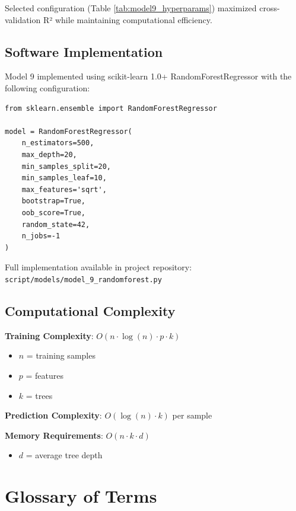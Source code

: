 Selected configuration (Table \ref{tab:model9_hyperparams}) maximized cross-validation R² while maintaining computational efficiency.

\subsection{Software Implementation}

Model 9 implemented using scikit-learn 1.0+ RandomForestRegressor with the following configuration:

\begin{verbatim}
from sklearn.ensemble import RandomForestRegressor

model = RandomForestRegressor(
    n_estimators=500,
    max_depth=20,
    min_samples_split=20,
    min_samples_leaf=10,
    max_features='sqrt',
    bootstrap=True,
    oob_score=True,
    random_state=42,
    n_jobs=-1
)
\end{verbatim}

Full implementation available in project repository: \texttt{script/models/model\_9\_randomforest.py}

\subsection{Computational Complexity}

\textbf{Training Complexity}: $O(n \cdot \log(n) \cdot p \cdot k)$
\begin{itemize}
    \item $n$ = \ModelNineTrainingSamples{} training samples
    \item $p$ = \ModelNineNumFeatures{} features
    \item $k$ = \ModelNineNTrees{} trees
\end{itemize}

\textbf{Prediction Complexity}: $O(\log(n) \cdot k)$ per sample

\textbf{Memory Requirements}: $O(n \cdot k \cdot d)$
\begin{itemize}
    \item $d$ = \ModelNineAvgTreeDepth{} average tree depth
\end{itemize}

\section{Glossary of Terms}

